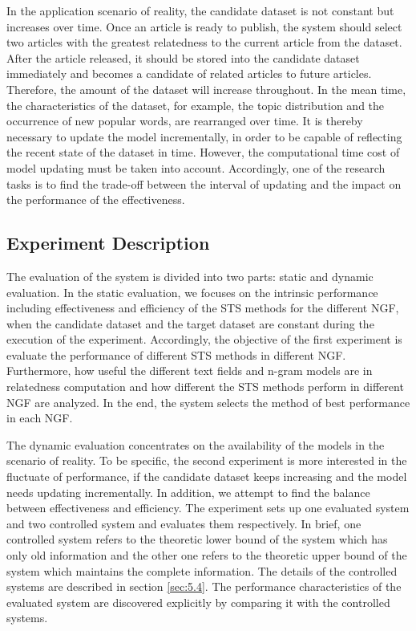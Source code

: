 In the application scenario of reality, the candidate dataset is not constant but increases over time. Once an article is ready to publish, the system should select two articles with the greatest relatedness to the current article from the dataset. After the article released, it should be stored into the candidate dataset immediately and becomes a candidate of related articles to future articles. Therefore, the amount of the dataset will increase throughout. In the mean time, the characteristics of the dataset, for example, the topic distribution and the occurrence of new popular words, are rearranged over time. It is thereby necessary to update the model incrementally, in order to be capable of reflecting the recent state of the dataset in time. However, the computational time cost of model updating must be taken into account. Accordingly, one of the research tasks is to find the trade-off between the interval of updating and the impact on the performance of the effectiveness.  

\bigbreak

\subsection{Experiment Description}
\label{sec:4.4}

The evaluation of the system is divided into two parts: static and dynamic evaluation. In the static evaluation, we focuses on the intrinsic performance including effectiveness and efficiency of the STS methods for the different NGF, when the candidate dataset and the target dataset are constant during the execution of the experiment. Accordingly, the objective of the first experiment is evaluate the performance of different STS methods in different NGF. Furthermore, how useful the different text fields and n-gram models are in relatedness computation and how different the STS methods perform in different NGF are analyzed. In the end, the system selects the method of best performance in each NGF. 

The dynamic evaluation concentrates on the availability of the models in the scenario of reality. To be specific, the second experiment is more interested in the fluctuate of performance, if the candidate dataset keeps increasing and the model needs updating incrementally. In addition, we attempt to find the balance between effectiveness and efficiency. The experiment sets up one evaluated system and two controlled system and evaluates them respectively. In brief, one controlled system refers to the theoretic lower bound of the system which has only old information and the other one refers to the theoretic upper bound of the system which maintains the complete information. The details of the controlled systems are described in section \ref{sec:5.4}. The performance characteristics of the evaluated system are discovered explicitly by comparing it with the controlled systems. 

